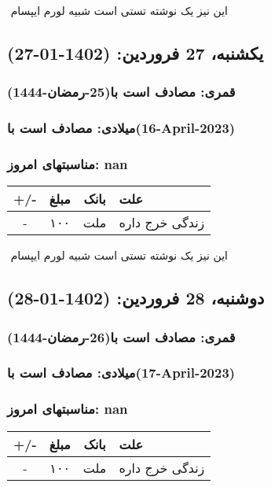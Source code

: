\documentclass{article}
\newcommand{\rnote}[1]{\marginpar{\textcolor{color}{\StrSubstitute{\##1}{ }{\_}}}}
\newcommand{\myRow}[4]{
    #1 & #2 & #3 & #4 \\ \hline
}
\begin{document}
‌
\rnote{تست}
این نیز یک نوشته تستی است شبیه لورم ایپسام




\newpage
{}
\textcolor{color}{
\section{ یکشنبه، 27 فروردین: (1402-01-27) }
\subsubsection*{قمری: مصادف است با(25-رمضان-1444)} 
\subsubsection*{میلادی: مصادف است با(16-April-2023)}
\subsubsection*{مناسبتهای امروز: nan}
}


\begin{tabular}{ | c | c | c | p{5cm} |}
    \hline
    \myRow{ +/- }{مبلغ}{بانک}{علت}
    \myRow{-}{۱۰۰}{ملت}{زندگی خرج داره}
\end{tabular}
\newline
\newline

‌
\rnote{تست}
این نیز یک نوشته تستی است شبیه لورم ایپسام




\newpage
{}
\textcolor{color}{
\section{ دوشنبه، 28 فروردین: (1402-01-28) }
\subsubsection*{قمری: مصادف است با(26-رمضان-1444)} 
\subsubsection*{میلادی: مصادف است با(17-April-2023)}
\subsubsection*{مناسبتهای امروز: nan}
}


\begin{tabular}{ | c | c | c | p{5cm} |}
    \hline
    \myRow{ +/- }{مبلغ}{بانک}{علت}
    \myRow{-}{۱۰۰}{ملت}{زندگی خرج داره}
\end{tabular}
\newline
\newline
\end{document}

